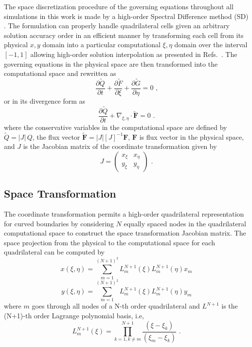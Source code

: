 The space discretization procedure of the governing equations throughout all simulations in this work is made by a high-order Spectral Difference method (SD) \cite{SD_II:07, Moreira2016}. The formulation can properly handle quadrilateral cells given an arbitrary solution accuracy order in an efficient manner by transforming each cell from its physical $x,y$ domain into a particular computational $\xi, \eta$ domain over the interval $[-1, 1]$ allowing high-order solution interpolation as presented in Refs.\ \cite{SD_II:07, SD_May:06}. The governing equations in the physical space are then transformed into the computational space and rewritten as
%
\begin{equation}
\frac{\partial \tilde{Q}}{\partial t} + \frac{\partial \tilde{F}}{\partial \xi} +
                                        \frac{\partial \tilde{G}}{\partial \eta}  = 0
\mbox{ ,}
\end{equation}
%
or in its divergence form as
%
\begin{equation}
\frac{\partial \tilde{Q}}{\partial t} + \nabla_{\xi,\eta} \cdot \tilde{\textbf{F}}  = 0
\mbox{ .}
\end{equation}
%
where the conservative variables in the computational space are defined by $\tilde{Q} = |J| \, Q$, the flux vector $\tilde{\textbf{F}} = |J|{[J]}^{-1}\textbf{F}$, $\textbf{F}$ is flux vector in the physical space,
and $J$ is the Jacobian matrix of the coordinate transformation given by
%
\begin{equation}
J = \left( \begin{array}{cc} x_\xi & x_\eta \\ y_\xi & y_\eta \end{array} \right)
\mbox{ .}
\end{equation}
%

\subsection{Space Transformation}

The coordinate transformation permits a high-order quadrilateral representation for curved boundaries by considering $N$ equally spaced nodes in the quadrilateral computational space to construct the space transformation Jacobian matrix. The space projection from the physical to the computational space for each quadrilateral can be computed by
%
\begin{equation}
    \label{eq_ho_quad_x}
    x(\xi, \eta) = \sum_{m=1}^{(N+1)^{2}}{L^{N+1}_m(\xi) L^{N+1}_m(\eta) x_{m}}
\end{equation}
%
\begin{equation}
    \label{eq_ho_quad_y}
    y(\xi, \eta) = \sum_{m=1}^{(N+1)^{2}}{L^{N+1}_m(\xi) L^{N+1}_m(\eta) y_{m}}    
\end{equation}
%
where $m$ goes through all nodes of a N-th order quadrilateral and $L^{N+1}$ is the (N+1)-th order Lagrange polynomial basis, i.e,
%
\begin{equation}
    \label{eq_lagrange}
    L^{N+1}_m(\xi) = \prod_{k=1, k \ne m}^{N+1}{\frac{(\xi-\xi_k)}{(\xi_m-\xi_k)}}
    \mbox{ .}
\end{equation}
%

